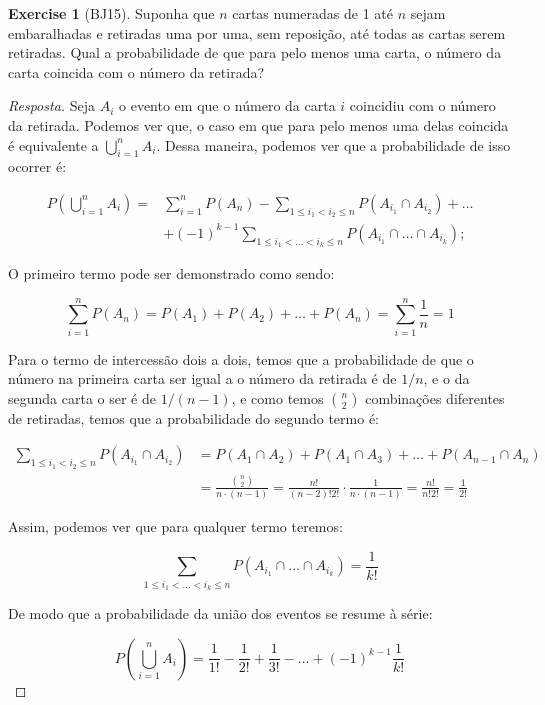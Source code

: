 \documentclass[
]{article}
\theoremstyle{definition}
\theoremstyle{definition}
\theoremstyle{definition}
\newtheorem{exercise}{Exercise}[section]
\theoremstyle{definition}
\theoremstyle{remark}
\begin{document}
\begin{exercise}[BJ15]

Suponha que \(n\) cartas numeradas de 1 até \(n\) sejam embaralhadas e retiradas uma por uma, sem reposição, até todas as cartas serem retiradas. Qual a probabilidade de que para pelo menos uma carta, o número da carta coincida com o número da retirada?

\begin{proof}[Resposta]
Seja \(A_{i}\) o evento em que o número da carta \(i\) coincidiu com o número da retirada. Podemos ver que, o caso em que para pelo menos uma delas coincida é equivalente a \(\bigcup_{i=1}^{n}A_{i}\). Dessa maneira, podemos ver que a probabilidade de isso ocorrer é:

\begin{align*}
P\left(\bigcup_{i=1}^{n} A_{i}\right) = &\sum_{i=1}^{n}P(A_{n}) - \sum_{1 \le i_{1} < i_{2} \le n}P(A_{i_{1}} \cap A_{i_{2}}) + \dots \\
&+ (-1)^{k-1} \sum_{1 \le i_{1} < \dots < i_{k} \le n}P(A_{i_{1}} \cap \dots \cap A_{i_{k}});
\end{align*}

O primeiro termo pode ser demonstrado como sendo:

\begin{equation*}
\sum_{i=1}^{n}P(A_{n}) = P(A_{1}) + P(A_{2}) + \dots + P(A_{n}) = \sum_{i=1}^{n}\frac{1}{n} = 1
\end{equation*}

Para o termo de intercessão dois a dois, temos que a probabilidade de que o número na primeira carta ser igual a o número da retirada é de \(1/n\), e o da segunda carta o ser é de \(1/(n-1)\), e como temos \(\binom{n}{2}\) combinações diferentes de retiradas, temos que a probabilidade do segundo termo é:

\begin{align*}
\sum_{1 \le i_{1} < i_{2} \le n}P(A_{i_{1}} \cap A_{i_{2}}) &= P(A_{1} \cap A_{2}) + P(A_{1} \cap A_{3}) + \dots + P(A_{n-1} \cap A_{n}) \\
&= \frac{\binom{n}{2}}{n \cdot (n-1)} = \frac{n!}{(n-2)!2!} \cdot \frac{1}{n \cdot (n-1)} = \frac{n!}{n!2!} = \frac{1}{2!}
\end{align*}

Assim, podemos ver que para qualquer termo teremos:

\begin{equation*}
\sum_{1 \le i_{1} < \dots < i_{k} \le n}P(A_{i_{1}} \cap \dots \cap A_{i_{k}}) = \frac{1}{k!}
\end{equation*}

De modo que a probabilidade da união dos eventos se resume à série:

\begin{equation*}
P\left(\bigcup_{i=1}^{n} A_{i}\right) = \frac{1}{1!} - \frac{1}{2!} + \frac{1}{3!} - \dots + (-1)^{k-1}\frac{1}{k!}
\end{equation*}
\end{proof}

\end{exercise}
\end{document}
